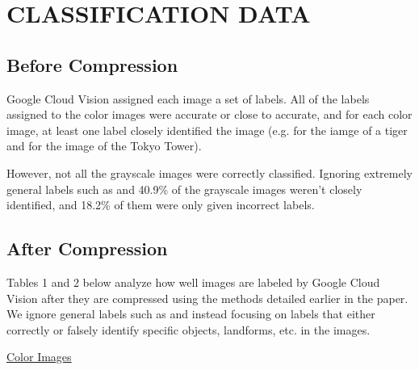 \documentclass[letterpaper, 10 pt, conference]{ieeeconf}  %
\begin{document}
\vspace*{3mm}

\section{CLASSIFICATION DATA}

\subsection{Before Compression}

Google Cloud Vision assigned each image a set of labels.
All of the labels assigned to the color images were
accurate or close to accurate, and for each color image,
at least one label closely identified the image (e.g. 
for the iamge of a tiger and  for the image of
the Tokyo Tower).

However, not all the grayscale images were correctly classified.
Ignoring extremely general labels such as 
and  40.9\% of the grayscale images
weren't closely identified, and 18.2\% of them were only given incorrect labels.

\subsection{After Compression}

Tables 1 and 2 below analyze how well images are labeled by
Google Cloud Vision after they are compressed using
the methods detailed earlier in the paper. We ignore general
labels such as  
and  instead focusing on labels that either correctly or falsely
identify specific objects, landforms, etc. in the images.

\vspace*{2mm}

\hspace*{28mm} \underline{Color Images}

\vspace*{2mm}
\end{document}
